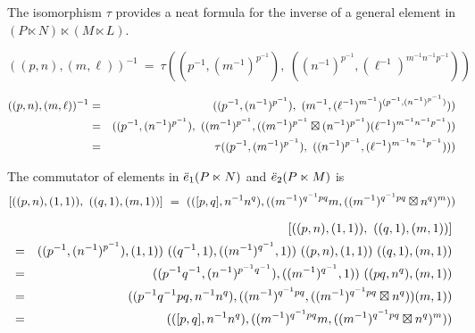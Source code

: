 \bigskip
The isomorphism $\tau$ provides a neat formula for the inverse of a 
general element in $(P \ltimes N) \ltimes (M \ltimes L)$.
\begin{lem}
$$
((p,n),(m,\ell))^{-1} ~=~ 
\tau((p^{-1},(m^{-1})^{p^{-1}}),~ 
 ((n^{-1})^{p^{-1}},(\ell^{-1})^{m^{-1}n^{-1}p^{-1}}))
$$
\end{lem}
\begin{pf}
\begin{eqnarray*}
((p,n),(m,\ell))^{-1} 
 &=& ((p^{-1},(n^{-1})^{p^{-1}}),~
        (m^{-1},(\ell^{-1})^{m^{-1}})^{(p^{-1},(n^{-1})^{p^{-1}})})) \\
 &=& ((p^{-1},(n^{-1})^{p^{-1}}),~
        ((m^{-1})^{p^{-1}},
          ((m^{-1})^{p^{-1}} \boxtimes (n^{-1})^{p^{-1}}) 
           (\ell^{-1})^{m^{-1}n^{-1}p^{-1}})) \\
 &=& \tau((p^{-1},(m^{-1})^{p^{-1}}),~ 
          ((n^{-1})^{p^{-1}},(\ell^{-1})^{m^{-1}n^{-1}p^{-1}}))) 
\end{eqnarray*}
\end{pf}

\begin{lem}
The commutator of elements in $\ddot{e}_1(P \ltimes N)$ 
and $\ddot{e}_2(P \ltimes M)$ is 
$$
 [((p,n),(1,1)),~((q,1),(m,1))]
~=~
 (([p,q],n^{-1}n^q), 
      ((m^{-1})^{q^{-1}pq}m,((m^{-1})^{q^{-1}pq}\boxtimes n^q)^m))
$$
\end{lem}
\begin{pf}
\vspace*{-8mm}
\begin{eqnarray*}
 & & [((p,n),(1,1)),~((q,1),(m,1))] \\
 &=& ((p^{-1},(n^{-1})^{p^{-1}}),(1,1))~
     ((q^{-1},1),((m^{-1})^{q^{-1}},1))~ 
     ((p,n),(1,1))~
     ((q,1),(m,1)) \\
 &=& ((p^{-1}q^{-1},(n^{-1})^{p^{-1}q^{-1}}),((m^{-1})^{q^{-1}},1))~ 
     ((pq,n^q),(m,1)) \\
 &=& ((p^{-1}q^{-1}pq,n^{-1}n^q), 
      ((m^{-1})^{q^{-1}pq},((m^{-1})^{q^{-1}pq}\boxtimes n^q))(m,1)) \\
 &=& (([p,q],n^{-1}n^q), 
      ((m^{-1})^{q^{-1}pq}m,((m^{-1})^{q^{-1}pq}\boxtimes n^q)^m)) 
\end{eqnarray*}
\end{pf}




